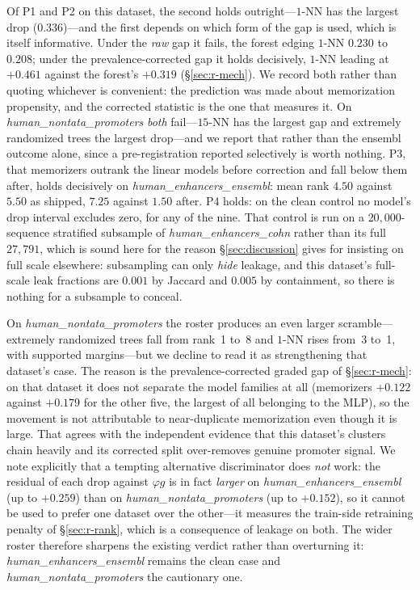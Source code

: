 \documentclass[webpdf,modern,large,namedate]{oup-authoring-template}%
\begin{document}
Of P1 and P2 on this dataset, the second holds outright---$1$-NN has the largest drop ($0.336$)---and the first depends on which form of the gap is used, which is itself informative. Under the \emph{raw} gap it fails, the forest edging $1$-NN $0.230$ to $0.208$; under the prevalence-corrected gap it holds decisively, $1$-NN leading at $+0.461$ against the forest's $+0.319$ (\S\ref{sec:r-mech}). We record both rather than quoting whichever is convenient: the prediction was made about memorization propensity, and the corrected statistic is the one that measures it. On \textit{human\_nontata\_promoters} \emph{both} fail---$15$-NN has the largest gap and extremely randomized trees the largest drop---and we report that rather than the ensembl outcome alone, since a pre-registration reported selectively is worth nothing. P3, that memorizers outrank the linear models before correction and fall below them after, holds decisively on \textit{human\_enhancers\_ensembl}: mean rank $4.50$ against $5.50$ as shipped, $7.25$ against $1.50$ after. P4 holds: on the clean control no model's drop interval excludes zero, for any of the nine. That control is run on a $20{,}000$-sequence stratified subsample of \textit{human\_enhancers\_cohn} rather than its full $27{,}791$, which is sound here for the reason \S\ref{sec:discussion} gives for insisting on full scale elsewhere: subsampling can only \emph{hide} leakage, and this dataset's full-scale leak fractions are $0.001$ by Jaccard and $0.005$ by containment, so there is nothing for a subsample to conceal.

On \textit{human\_nontata\_promoters} the roster produces an even larger scramble---extremely randomized trees fall from rank~1 to~8 and $1$-NN rises from~3 to~1, with supported margins---but we decline to read it as strengthening that dataset's case. The reason is the prevalence-corrected graded gap of \S\ref{sec:r-mech}: on that dataset it does not separate the model families at all (memorizers $+0.122$ against $+0.179$ for the other five, the largest of all belonging to the MLP), so the movement is not attributable to near-duplicate memorization even though it is large. That agrees with the independent evidence that this dataset's clusters chain heavily and its corrected split over-removes genuine promoter signal. We note explicitly that a tempting alternative discriminator does \emph{not} work: the residual of each drop against $\varphi g$ is in fact \emph{larger} on \textit{human\_enhancers\_ensembl} (up to $+0.259$) than on \textit{human\_nontata\_promoters} (up to $+0.152$), so it cannot be used to prefer one dataset over the other---it measures the train-side retraining penalty of \S\ref{sec:r-rank}, which is a consequence of leakage on both. The wider roster therefore sharpens the existing verdict rather than overturning it: \textit{human\_enhancers\_ensembl} remains the clean case and \textit{human\_nontata\_promoters} the cautionary one.
\end{document}
